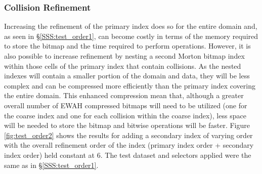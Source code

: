 \documentclass[apjl]{emulateapj}
\begin{document}
\subsubsection{Collision Refinement}\label{SSS:test_order2}
Increasing the refinement of the primary index does so for the entire domain and, as seen in \S\ref{SSS:test_order1}, can become costly in terms of the memory required to store the bitmap and the time required to perform operations. However, it is also possible to increase refinement by nesting a second Morton bitmap index within those cells of the primary index that contain collisions. As the nested indexes will contain a smaller portion of the domain and data, they will be less complex and can be compressed more efficiently than the primary index covering the entire domain. This enhanced compression mean that, although a greater overall number of EWAH compressed bitmaps will need to be utilized (one for the coarse index and one for each collision within the coarse index), less space will be needed to store the bitmap and bitwise operations will be faster. Figure \ref{fig:test_order2} shows the results for adding a secondary index of varying order with the overall refinement order of the index (primary index order + secondary index order) held constant at 6. The test dataset and selectors applied were the same as in \S\ref{SSS:test_order1}.
%
\ifinclfig
\end{document}
